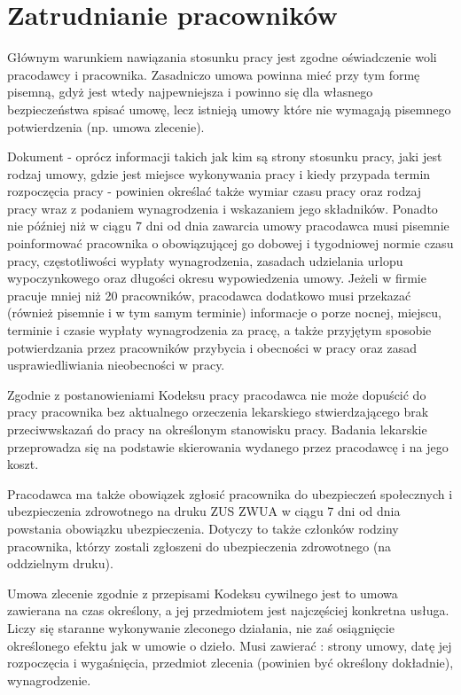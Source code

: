 \documentclass[11pt]{article}
\begin{document}
	\section{Zatrudnianie pracowników}
	Głównym warunkiem nawiązania stosunku pracy jest zgodne oświadczenie woli pracodawcy i pracownika. Zasadniczo umowa powinna mieć przy tym formę pisemną, gdyż jest wtedy najpewniejsza i powinno się dla własnego bezpieczeństwa spisać umowę, lecz istnieją umowy które nie wymagają pisemnego potwierdzenia (np. umowa zlecenie).
	
	Dokument - oprócz informacji takich jak kim są strony stosunku pracy, jaki jest rodzaj umowy, gdzie jest miejsce wykonywania pracy i kiedy przypada termin rozpoczęcia pracy - powinien określać także wymiar czasu pracy oraz rodzaj pracy wraz z podaniem wynagrodzenia i wskazaniem jego składników.
	Ponadto nie później niż w ciągu 7 dni od dnia zawarcia umowy pracodawca musi pisemnie poinformować pracownika o obowiązującej go dobowej i tygodniowej normie czasu pracy, częstotliwości wypłaty wynagrodzenia, zasadach udzielania urlopu wypoczynkowego oraz długości okresu wypowiedzenia umowy. Jeżeli w firmie pracuje mniej niż 20 pracowników, pracodawca dodatkowo musi przekazać (również pisemnie i w tym samym terminie) informacje o porze nocnej, miejscu, terminie i czasie wypłaty wynagrodzenia za pracę, a także przyjętym sposobie potwierdzania przez pracowników przybycia i obecności w pracy oraz zasad usprawiedliwiania nieobecności w pracy.
	
	Zgodnie z postanowieniami Kodeksu pracy pracodawca nie może dopuścić do pracy pracownika bez aktualnego orzeczenia lekarskiego stwierdzającego brak przeciwwskazań do pracy na określonym stanowisku pracy. Badania lekarskie przeprowadza się na podstawie skierowania wydanego przez pracodawcę i na jego koszt.
	
	
    Pracodawca ma także obowiązek zgłosić pracownika do ubezpieczeń społecznych i ubezpieczenia zdrowotnego na druku ZUS ZWUA w ciągu 7 dni od dnia powstania obowiązku ubezpieczenia. Dotyczy to także członków rodziny pracownika, którzy zostali zgłoszeni do ubezpieczenia zdrowotnego (na oddzielnym druku).
    
    Umowa zlecenie zgodnie z przepisami Kodeksu cywilnego jest to umowa zawierana na czas określony, a jej przedmiotem jest najczęściej konkretna usługa. Liczy się staranne wykonywanie zleconego działania, nie zaś osiągnięcie określonego efektu jak w umowie o dzieło. Musi zawierać : strony umowy, datę jej rozpoczęcia i wygaśnięcia, przedmiot zlecenia (powinien być określony dokładnie), wynagrodzenie.
    
\end{document}
